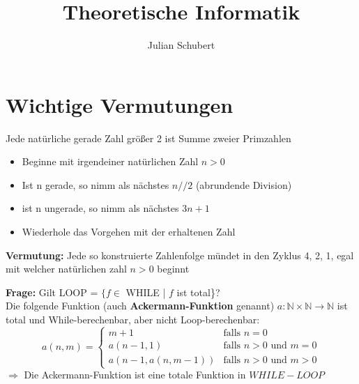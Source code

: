 \documentclass[14pt]{article}
\title{Theoretische Informatik}
\author{Julian Schubert}
\begin{document}
\maketitle
\tableofcontents

\newpage

\section{Wichtige Vermutungen}
\begin{definition}
    Jede natürliche gerade Zahl größer 2 ist Summe zweier Primzahlen
\end{definition}
\begin{definition}
    \begin{itemize}
        \item Beginne mit irgendeiner natürlichen Zahl $n > 0$
        \item Ist n gerade, so nimm als nächstes $n // 2$ (abrundende Division)
        \item ist n ungerade, so nimm als nächstes $3n + 1$
        \item Wiederhole das Vorgehen mit der erhaltenen Zahl
    \end{itemize}
    \noindent
    \textbf{Vermutung:} Jede so konstruierte Zahlenfolge mündet in den Zyklus
    4, 2, 1, egal mit welcher natürlichen zahl $n > 0$ beginnt
\end{definition}
\begin{definition}
    \textbf{Frage:} Gilt LOOP = $\{f \in$ WHILE | $f$ ist total\}? \\
    Die folgende Funktion (auch \textbf{Ackermann-Funktion} genannt)
    $a: \mathbb{N} \times \mathbb{N} \rightarrow \mathbb{N}$ ist
    total und While-berechenbar, aber nicht Loop-berechenbar: \\
    \begin{equation*}
        a(n, m) =
        \begin{cases}
            m + 1                 & \text{falls $n = 0$}             \\
            a(n - 1, 1)           & \text{falls $n > 0$ und $m = 0$} \\
            a(n - 1, a(n, m - 1)) & \text{falls $n > 0$ und $m > 0$}
        \end{cases}
    \end{equation*}
    $\Rightarrow$ Die Ackermann-Funktion ist eine totale Funktion in
    $WHILE-LOOP$
\end{definition}
\end{document}
